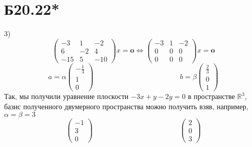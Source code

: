 \documentclass[a4paper,12pt]{article} %
\begin{document}
\section*{Б20.22*}
3)$$\begin{pmatrix*}
-3&1&-2\\
6&-2&4\\
-15&5&-10
\end{pmatrix*}x=\textbf{o}\Leftrightarrow\begin{pmatrix*}
-3&1&-2\\
0&0&0\\
0&0&0
\end{pmatrix*}x=\textbf{o}$$$$a=\alpha\begin{pmatrix*}
-\frac{1}{3}\\
1\\
0
\end{pmatrix*}\qquad\qquad\qquad\qquad\qquad\qquad b=\beta\begin{pmatrix*}
\frac{2}{3}\\
0\\
1
\end{pmatrix*}$$
Так, мы получили уравнение плоскости $-3x+y-2y=0$ в пространстве $\mathbb{R}^3$, базис полученного двумерного пространства можно получить взяв, например, $\alpha=\beta=3$
$$\begin{pmatrix*}
-1\\
3\\
0
\end{pmatrix*}\qquad\qquad\qquad\qquad\qquad\qquad\begin{pmatrix*}
2\\
0\\
3
\end{pmatrix*}$$
\end{document}

